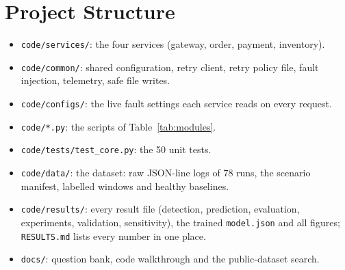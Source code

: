 \documentclass[conference,a4paper]{IEEEtran}
\begin{document}
\section{Project Structure}
\begin{itemize}
\item \texttt{code/services/}: the four services (gateway, order, payment, inventory).
\item \texttt{code/common/}: shared configuration, retry client, retry policy file, fault injection, telemetry, safe file writes.
\item \texttt{code/configs/}: the live fault settings each service reads on every request.
\item \texttt{code/*.py}: the scripts of Table~\ref{tab:modules}.
\item \texttt{code/tests/test\_core.py}: the 50 unit tests.
\item \texttt{code/data/}: the dataset: raw JSON-line logs of 78 runs, the scenario manifest, labelled windows and healthy baselines.
\item \texttt{code/results/}: every result file (detection, prediction, evaluation, experiments, validation, sensitivity), the trained \texttt{model.json} and all figures; \texttt{RESULTS.md} lists every number in one place.
\item \texttt{docs/}: question bank, code walkthrough and the public-dataset search.
\end{itemize}
\end{document}
